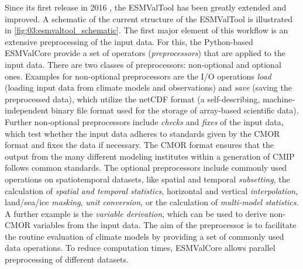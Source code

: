 Since its first release in 2016 \autocite{Eyring2016a}, the \ac{ESMValTool} has
been greatly extended and improved. A schematic of the current structure of the
\ac{ESMValTool} is illustrated in \cref{fig:03:esmvaltool_schematic}. The first
major element of this workflow is an extensive preprocessing of the input data.
For this, the Python-based \acf{ESMValCore} provide a set of operators
(\emph{preprocessors}) that are applied to the input data. There are two
classes of preprocessors: non-optional and optional ones. Examples for
non-optional preprocessors are the \ac{I/O} operations \emph{load} (loading
input data from climate models and observations) and \emph{save} (saving the
preprocessed data), which utilize the \ac{netCDF} format (a self-describing,
machine-independent binary file format used for the storage of array-based
scientific data). Further non-optional preprocessors include \emph{checks} and
\emph{fixes} of the input data, which test whether the input data adheres to
standards given by the \ac{CMOR} format and fixes the data if necessary. The
\ac{CMOR} format ensures that the output from the many different modeling
institutes within a generation of \ac{CMIP} follows common standards. The
optional preprocessors include commonly used operations on spatiotemporal
datasets, like spatial and temporal \emph{subsetting}, the calculation of
\emph{spatial and temporal statistics}, horizontal and vertical
\emph{interpolation}, land/sea/ice \emph{masking}, \emph{unit conversion}, or
the calculation of \emph{multi-model statistics}. A further example is the
\emph{variable derivation}, which can be used to derive non-\ac{CMOR} variables
from the input data. The aim of the preprocessor is to facilitate the routine
evaluation of climate models by providing a set of commonly used data
operations. To reduce computation times, \ac{ESMValCore} allows parallel
preprocessing of different datasets.


